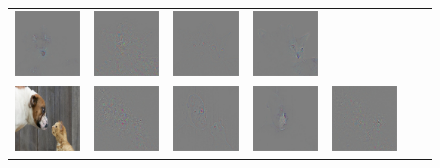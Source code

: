 \begin{figure}
\begin{center}
\begin{tabular}{c||ccc||ccc}
\includegraphics[width=0.13\linewidth]{figs/examples/googlenet/soft/dog-cat3_diff_188} &
\includegraphics[width=0.13\linewidth]{figs/examples/googlenet/oxford/dog-cat3_diff_286} &
\includegraphics[width=0.13\linewidth]{figs/examples/googlenet/deconv/dog-cat3_diff_286} &
\includegraphics[width=0.13\linewidth]{figs/examples/googlenet/soft/dog-cat3_diff_286} \\
\includegraphics[width=0.13\linewidth]{figs/examples/googlenet/oxford/dog-cat4} &
\includegraphics[width=0.13\linewidth]{figs/examples/googlenet/oxford/dog-cat4_diff_243} &
\includegraphics[width=0.13\linewidth]{figs/examples/googlenet/deconv/dog-cat4_diff_243} &
\includegraphics[width=0.13\linewidth]{figs/examples/googlenet/soft/dog-cat4_diff_243} &
\includegraphics[width=0.13\linewidth]{figs/examples/googlenet/oxford/dog-cat4_diff_286} &

\end{tabular}
\end{center}
\end{figure}
